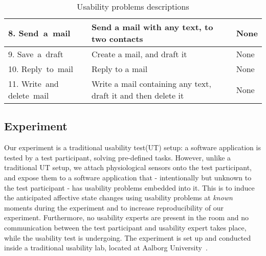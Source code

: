 \begin{table}[h]
\begin{tabular}[c]{|p{60pt}|p{80pt}|p{80pt}|}
    \small{8. Send~a~mail}            & \small{Send a mail with any text, to two contacts}                                                                             & \small{None}                                                                                             \\ \hline
    \small{9. Save~a~draft}           & \small{Create a mail, and draft it}                                                                                            & \small{None}                                                                                             \\ \hline
    \small{10. Reply~to~mail}         & \small{Reply to a mail}                                                                                                        & \small{None}                                                                                             \\ \hline
    \small{11. Write~and delete~mail} & \small{Write a mail containing any text, draft it and then delete it}                                                          & \small{None}                                                                                             \\ \hline
  \end{tabular}
  \caption{Usability problems descriptions}
  \label{tab:ups-desc}
\end{table}

\subsection{Experiment}
Our experiment is a traditional usability test(UT) setup: a software application is tested by
a test participant, solving pre-defined tasks. However, unlike a traditional UT setup, we attach physiological sensors
onto the test participant, and expose them to a software application that - intentionally but unknown to the test
participant - has usability problems embedded into it. This is to induce the anticipated affective state changes using
usability problems at \textit{known} moments during the experiment and to increase reproducibility of our
experiment. Furthermore, no usability experts are present in the room and no communication between the test participant
and usability expert takes place, while the usability test is undergoing. The experiment is set up and conducted inside
a traditional usability lab, located at Aalborg University~\cite{usability_lab_cassiopeia}.

